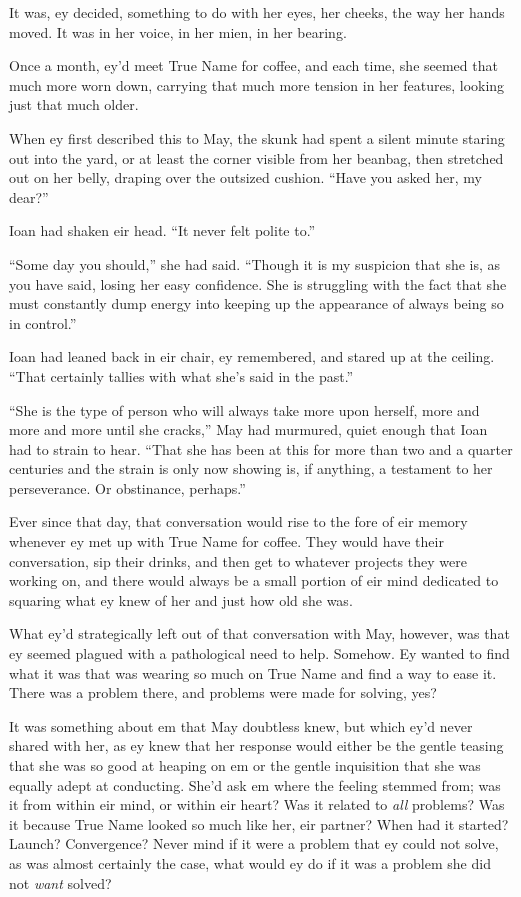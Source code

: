It was, ey decided, something to do with her eyes, her cheeks, the way her hands moved. It was in her voice, in her mien, in her bearing.

Once a month, ey'd meet True Name for coffee, and each time, she seemed that much more worn down, carrying that much more tension in her features, looking just that much older.

When ey first described this to May, the skunk had spent a silent minute staring out into the yard, or at least the corner visible from her beanbag, then stretched out on her belly, draping over the outsized cushion. ``Have you asked her, my dear?''

Ioan had shaken eir head. ``It never felt polite to.''

``Some day you should,'' she had said. ``Though it is my suspicion that she is, as you have said, losing her easy confidence. She is struggling with the fact that she must constantly dump energy into keeping up the appearance of always being so in control.''

Ioan had leaned back in eir chair, ey remembered, and stared up at the ceiling. ``That certainly tallies with what she's said in the past.''

``She is the type of person who will always take more upon herself, more and more and more until she cracks,'' May had murmured, quiet enough that Ioan had to strain to hear. ``That she has been at this for more than two and a quarter centuries and the strain is only now showing is, if anything, a testament to her perseverance. Or obstinance, perhaps.''

Ever since that day, that conversation would rise to the fore of eir memory whenever ey met up with True Name for coffee. They would have their conversation, sip their drinks, and then get to whatever projects they were working on, and there would always be a small portion of eir mind dedicated to squaring what ey knew of her and just how old she was.

What ey'd strategically left out of that conversation with May, however, was that ey seemed plagued with a pathological need to help. Somehow. Ey wanted to find what it was that was wearing so much on True Name and find a way to ease it. There was a problem there, and problems were made for solving, yes?

It was something about em that May doubtless knew, but which ey'd never shared with her, as ey knew that her response would either be the gentle teasing that she was so good at heaping on em or the gentle inquisition that she was equally adept at conducting. She'd ask em where the feeling stemmed from; was it from within eir mind, or within eir heart? Was it related to \emph{all} problems? Was it because True Name looked so much like her, eir partner? When had it started? Launch? Convergence? Never mind if it were a problem that ey could not solve, as was almost certainly the case, what would ey do if it was a problem she did not \emph{want} solved?

